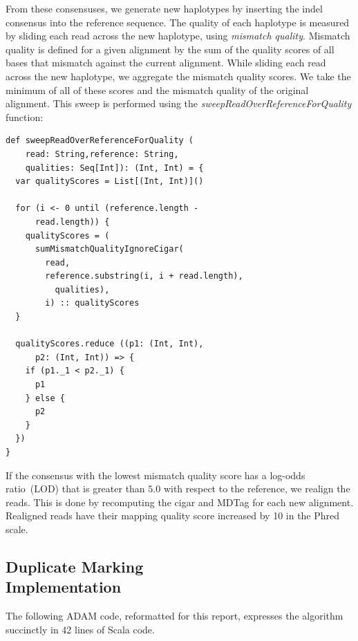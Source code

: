 \documentclass[10pt,twocolumn]{article}
\theoremstyle{plain}
\begin{document}
From these consensuses, we generate new haplotypes by inserting the indel consensus into the reference sequence. The quality of each haplotype is measured
by sliding each read across the new haplotype, using \emph{mismatch quality}. Mismatch quality is defined for a given alignment by the sum of the quality scores
of all bases that mismatch against the current alignment. While sliding each read across the new haplotype, we aggregate the mismatch quality scores. We take
the minimum of all of these scores and the mismatch quality of the original alignment. This sweep is performed using the \emph{sweepReadOverReferenceForQuality}
function:

\begin{lstlisting}
def sweepReadOverReferenceForQuality (
    read: String,reference: String,
    qualities: Seq[Int]): (Int, Int) = {
  var qualityScores = List[(Int, Int)]()

  for (i <- 0 until (reference.length -
      read.length)) {
    qualityScores = (
      sumMismatchQualityIgnoreCigar(
        read,
        reference.substring(i, i + read.length),
          qualities),
        i) :: qualityScores
  }

  qualityScores.reduce ((p1: (Int, Int),
      p2: (Int, Int)) => {
    if (p1._1 < p2._1) {
      p1
    } else {
      p2
    }
  })
}
\end{lstlisting}

If the consensus with the lowest mismatch quality score has a log-odds ratio~(LOD) that is greater than $5.0$ with respect to the reference, we realign the reads.
This is done by recomputing the cigar and MDTag for each new alignment. Realigned reads have their mapping quality score increased by 10 in the Phred scale.

\subsection{Duplicate Marking\\Implementation}
\label{sec:duplicate-marking-implementation}

The following ADAM code, reformatted for this report, expresses the algorithm succinctly in 42 lines of Scala code.
\end{document}
